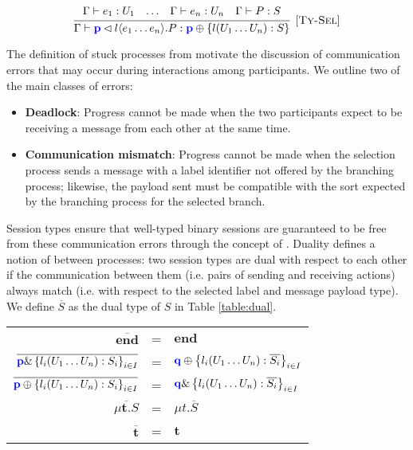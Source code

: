 $$
\infer[\mbox{\rulename{Ty-Sel}}]{
	\Gamma \vdash \sel{\parti{p}}{l}{e_1 \dots e_n}.P : \tysel{\parti{p}}{l(U_1 \dots U_n): S}
	}{
	\begin{array}{cccc}
	\Gamma \vdash e_1 : U_1
	&
	\dots
	&
	\Gamma \vdash e_n : U_n
	&
    \Gamma \vdash P : S
	\end{array}
}
$$

The definition of stuck processes from \mathref{\ref{section_async}} motivate the discussion of communication errors that may occur during interactions among participants. We outline two of the main classes of errors:

\begin{itemize}
\item \textbf{Deadlock}: Progress cannot be made when the two participants expect to be receiving a message from each other at the same time.
\item \textbf{Communication mismatch}: Progress cannot be made when the selection process sends a message with a label identifier not offered by the branching process; likewise, the payload sent must be compatible with the sort expected by the branching process for the selected branch.
\end{itemize}

Session types ensure that well-typed binary sessions are guaranteed to be free from these communication errors through the concept of . Duality defines a notion of  between processes: two session types are dual with respect to each other if the communication between them (i.e. pairs of sending and receiving actions) always match (i.e. with respect to the selected label and message payload type). We define $\overline{S}$ as the dual type of $S$ in Table \ref{table:dual}.

\renewcommand{\arraystretch}{1.2}
\begin{center}
\begin{tabular}{rcl}
$\overline{\mathbf{end}}$ & = & $\mathbf{end}$ \\
$\overline{{\color{blue}\mathbf{p}} \& \left\{l_i(U_1 \dots U_n):S_i\right\}_{i\in I}}$ & = & ${\color{blue}\mathbf{q}} \oplus \left\{l_i(U_1 \dots U_n):\overline{S_i}\right\}_{i\in I}$ \\
$\overline{{\color{blue}\mathbf{p}} \oplus \left\{l_i(U_1 \dots U_n):S_i\right\}_{i\in I}}$ & = & ${\color{blue}\mathbf{q}} \& \left\{l_i(U_1 \dots U_n):\overline{S_i}\right\}_{i\in I}$ \\
$\overline{\mu \mathbf{t}. S}$ & = & $\mu t. \overline{S}$ \\
$\overline{\mathbf{t}}$ & = & $\mathbf{t}$ \\ 
\end{tabular}
\label{table:dual}
\end{center}
\renewcommand{\arraystretch}{1}


